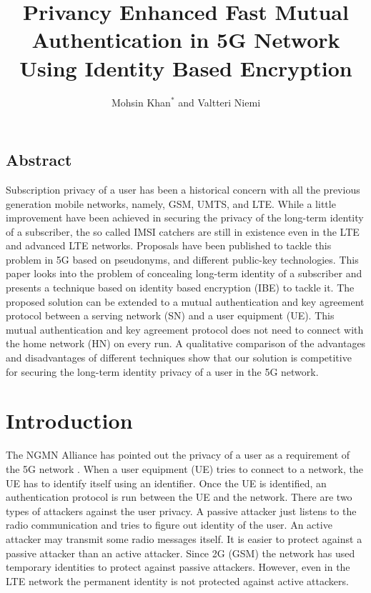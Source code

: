 \documentclass{river-journal}
\begin{document}
\begin{opening}
\title{Privancy Enhanced Fast Mutual Authentication in 5G Network Using Identity Based Encryption}
\author{Mohsin Khan$^{*}$ and Valtteri Niemi}
\end{opening}


\subsection*{Abstract}
Subscription privacy of a user has been a historical concern with all the previous generation mobile networks, namely, GSM, UMTS, and LTE. While a little improvement have been achieved in securing the privacy of the long-term identity of a subscriber, the so called IMSI catchers are still in existence even in the LTE and advanced LTE networks. Proposals have been published to tackle this problem in 5G based on pseudonyms, and different public-key technologies. This paper looks into the problem of concealing long-term identity of a subscriber and presents a technique based on identity based encryption (IBE) to tackle it. The proposed solution can be extended to a mutual authentication and key agreement protocol between a serving network (SN) and a user equipment (UE). This mutual authentication and key agreement protocol does not need to connect with the home network (HN) on every run. A qualitative comparison of the advantages and disadvantages of different techniques show that our solution is competitive for securing the long-term identity privacy of a user in the 5G network.



\section{Introduction}
\label{intro} The NGMN Alliance has pointed out the privacy of a user as a requirement of the 5G network \cite{NGMN_white_paper}. When a user equipment (UE) tries to connect to a network, the UE has to identify itself using an identifier. Once the UE is identified, an authentication protocol is run between the UE and the network. There are two types of attackers against the user privacy. A passive attacker just listens to the radio communication and tries to figure out identity of the user. An active attacker may transmit some radio messages itself. It is easier to protect against a passive attacker than an active attacker. Since 2G (GSM) the network has used temporary identities to protect against passive attackers. However, even in the LTE network the permanent identity is not protected against active attackers.
\end{document}
